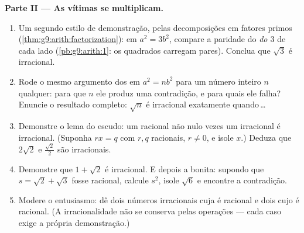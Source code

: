 \begin{problem}
\medskip
\noindent\textbf{Parte II --- As vítimas se multiplicam.}
\begin{enumerate}[resume]
  \item Um segundo estilo de demonstração, pelas decomposições em
        fatores primos (\cref{thm:g9:arith:factorization}): em
        $a^2 = 3b^2$, compare a paridade do \emph{ do $3$} de
        cada lado (\cref{pb:g9:arith:1}: os quadrados carregam
         pares). Conclua que $\sqrt3$ é irracional.
  \item Rode o mesmo argumento dos  em $a^2 = n b^2$ para um
        número inteiro $n$ qualquer: para que $n$ ele produz uma
        contradição, e para quais ele falha? Enuncie o resultado
        completo: $\sqrt n$ é irracional exatamente quando\,\dots
  \item Demonstre o lema do escudo: um racional não nulo vezes um
        irracional é irracional. (Suponha $r x = q$ com $r, q$
        racionais, $r \neq 0$, e isole $x$.) Deduza que $2\sqrt2$ e
        $\frac{\sqrt2}{2}$ são irracionais.
  \item Demonstre que $1 + \sqrt2$ é irracional. E depois a bonita:
        supondo que $s = \sqrt2 + \sqrt3$ fosse racional, calcule
        $s^2$, isole $\sqrt6$ e encontre a contradição.
  \item Modere o entusiasmo: dê dois números irracionais cuja
        \emph{} é racional e dois cujo \emph{} é racional.
        (A irracionalidade não se conserva pelas operações --- cada
        caso exige a própria demonstração.)
\end{enumerate}


\end{problem}
